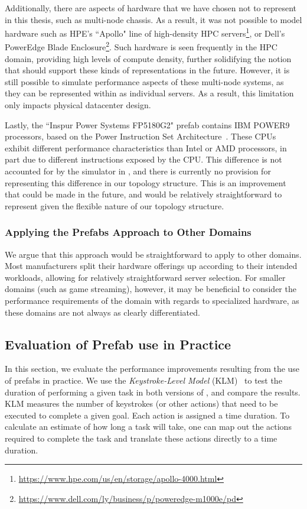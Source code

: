 \documentclass[11pt]{article}
\begin{document}
			Additionally, there are aspects of hardware that we have chosen not to represent in this thesis, such as multi-node chassis.
			As a result, it was not possible to model hardware such as HPE's ``Apollo" line of high-density HPC servers\footnote{\url{https://www.hpe.com/us/en/storage/apollo-4000.html}}, or Dell's PowerEdge Blade Enclosure\footnote{\url{https://www.dell.com/ly/business/p/poweredge-m1000e/pd}}.
			Such hardware is seen frequently in the HPC domain, providing high levels of compute density, further solidifying the notion that \opendc{} should support these kinds of representations in the future.
			However, it is still possible to simulate performance aspects of these multi-node systems, as they can be represented within \opendc{} as individual servers.
			As a result, this limitation only impacts physical datacenter design.

			Lastly, the ``Inspur Power Systems FP5180G2" prefab contains IBM POWER9 processors, based on the Power Instruction Set Architecture~\cite{IBM2017}.
			These CPUs exhibit different performance characteristics than Intel or AMD processors, in part due to different instructions exposed by the CPU.
			This difference is not accounted for by the simulator in \opendc{}, and there is currently no provision for representing this difference in our topology structure.
			This is an improvement that could be made in the future, and would be relatively straightforward to represent given the flexible nature of our topology structure.


		\subsubsection{Applying the Prefabs Approach to Other Domains}
			We argue that this approach would be straightforward to apply to other domains.
			Most manufacturers split their hardware offerings up according to their intended workloads, allowing for relatively straightforward server selection.
			For smaller domains (such as game streaming), however, it may be beneficial to consider the performance requirements of the domain with regards to specialized hardware, as these domains are not always as clearly differentiated.

	\subsection{Evaluation of Prefab use in Practice}
		In this section, we evaluate the performance improvements resulting from the use of prefabs in practice.
		We use the \textit{Keystroke-Level Model} (KLM)~\cite{Newell1980} to test the duration of performing a given task in both versions of \opendc{}, and compare the results.
		KLM measures the number of keystrokes (or other actions) that need to be executed to complete a given goal. 
		Each action is assigned a time duration.
		To calculate an estimate of how long a task will take, one can map out the actions required to complete the task and translate these actions directly to a time duration.
\end{document}
